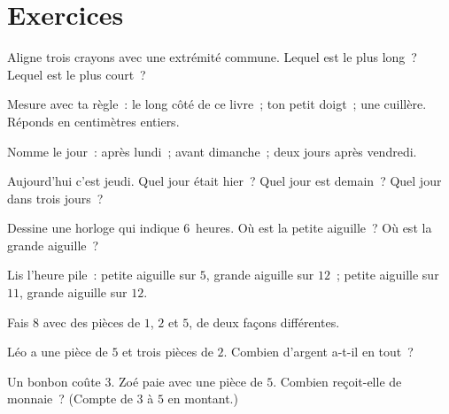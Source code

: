 \section{Exercices}

\begin{exercise}[$\star$]\label{exo:g1:measure:1}
Aligne trois crayons avec une extrémité commune. Lequel est le
plus long~? Lequel est le plus court~?
\end{exercise}

\begin{exercise}[$\star$]\label{exo:g1:measure:2}
Mesure avec ta règle~: le long côté de ce livre~; ton petit
doigt~; une cuillère. Réponds en centimètres entiers.
\end{exercise}

\begin{exercise}[$\star$]\label{exo:g1:measure:3}
Nomme le jour~: après lundi~; avant dimanche~; deux jours après
vendredi.
\end{exercise}

\begin{exercise}[$\star$]\label{exo:g1:measure:4}
Aujourd'hui c'est jeudi. Quel jour était hier~? Quel jour est
demain~? Quel jour dans trois jours~?
\end{exercise}

\begin{exercise}[$\star$]\label{exo:g1:measure:5}
Dessine une horloge qui indique $6$~heures. Où est la petite
aiguille~? Où est la grande aiguille~?
\end{exercise}

\begin{exercise}[$\star$]\label{exo:g1:measure:6}
Lis l'heure pile~: petite aiguille sur $5$, grande aiguille sur
$12$~; petite aiguille sur $11$, grande aiguille sur $12$.
\end{exercise}

\begin{exercise}[$\star$]\label{exo:g1:measure:7}
Fais $8$ avec des pièces de $1$, $2$ et $5$, de deux façons
différentes.
\end{exercise}

\begin{exercise}[$\star$]\label{exo:g1:measure:8}
Léo a une pièce de $5$ et trois pièces de $2$. Combien
d'argent a-t-il en tout~?
\end{exercise}

\begin{exercise}[$\star\star$]\label{exo:g1:measure:9}
Un bonbon coûte $3$. Zoé paie avec une pièce de $5$. Combien
reçoit-elle de monnaie~? (Compte de $3$ à $5$ en montant.)
\end{exercise}
